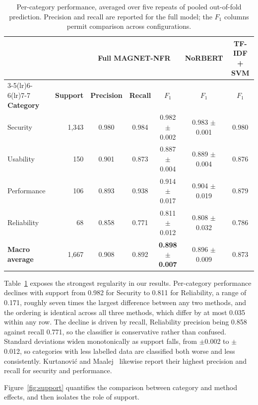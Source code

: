 \documentclass[11pt,a4paper]{article}
\begin{document}
\begin{table}[htbp]
\centering
\caption{Per-category performance, averaged over five repeats of pooled out-of-fold
prediction. Precision and recall are reported for the full model; the $F_1$ columns permit
comparison across configurations.}
\label{tab:percat}
\small
\begin{tabular}{@{}lrccccc@{}}
\toprule
& & \multicolumn{3}{c}{\textbf{Full MAGNET-NFR}} & \textbf{NoRBERT} & \textbf{TF-IDF + SVM}\\
\cmidrule(lr){3-5}\cmidrule(lr){6-6}\cmidrule(lr){7-7}
\textbf{Category} & \textbf{Support} & \textbf{Precision} & \textbf{Recall} & \textbf{$F_1$} & \textbf{$F_1$} & \textbf{$F_1$}\\
\midrule
Security    & 1{,}343 & 0.980 & 0.984 & 0.982 $\pm$ 0.002 & 0.983 $\pm$ 0.001 & 0.980\\
Usability   & 150 & 0.901 & 0.873 & 0.887 $\pm$ 0.004 & 0.889 $\pm$ 0.004 & 0.876\\
Performance & 106 & 0.893 & 0.938 & 0.914 $\pm$ 0.017 & 0.904 $\pm$ 0.019 & 0.879\\
Reliability & 68 & 0.858 & 0.771 & 0.811 $\pm$ 0.012 & 0.808 $\pm$ 0.032 & 0.786\\
\midrule
\textbf{Macro average} & 1{,}667 & 0.908 & 0.892 & \textbf{0.898 $\pm$ 0.007} & 0.896 $\pm$ 0.009 & 0.873\\
\bottomrule
\end{tabular}
\end{table}

Table~\ref{tab:percat} exposes the strongest regularity in our results. Per-category performance declines
with support from 0.982 for Security to 0.811 for Reliability, a range of 0.171, roughly seven times the
largest difference between any two methods, and the ordering is identical across all three methods, which
differ by at most 0.035 within any row. The decline is driven by recall, Reliability precision being 0.858
against recall 0.771, so the classifier is conservative rather than confused. Standard deviations widen
monotonically as support falls, from $\pm$0.002 to $\pm$0.012, so categories with less labelled data are
classified both worse and less consistently. Kurtanović and Maalej~\cite{kurtanovic2017} likewise report
their highest precision and recall for security and performance.

Figure~\ref{fig:support} quantifies the comparison between category and method effects,
and then isolates the role of support.
\end{document}
